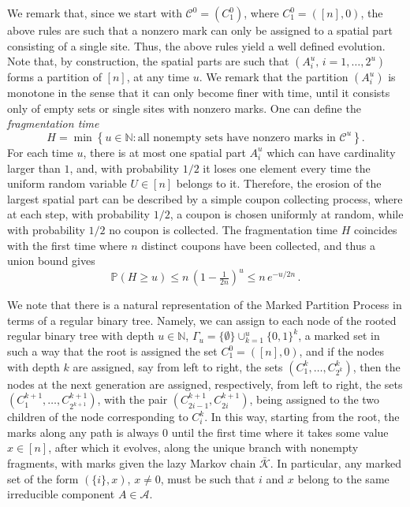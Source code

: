 \documentclass[11pt,reqno]{amsart}
\numberwithin{equation}{section}
\numberwithin{figure}{section}
\renewcommand{\leq}{\le}%
\renewcommand{\geq}{\ge} %
\newcommand{\1}{\mathds{1}}
\let\G=\Gamma
\newcommand{\cA}{\ensuremath{\mathcal A}}
\newcommand{\cC}{\ensuremath{\mathcal C}}
\newcommand{\bbN}{{\ensuremath{\mathbb N}} }
\begin{document}
We remark that, since we start with $\cC^0=(C_1^0)$, where $C_1^0=([n],0)$, the above rules are such that a nonzero mark can only be assigned to a spatial part consisting of a single site.  Thus, the above rules 
yield a well defined evolution. Note that, by construction, the spatial parts are such that $(A^u_i,\,i=1,\dots,2^u)$ forms a partition of $[n]$, at any time $u$.  We remark that the partition $(A^u_i)$ is monotone in the sense that  it can only become finer with time, until it consists only of empty sets or single sites with nonzero marks. One can define the {\em fragmentation time}
\begin{equation}\label{eq:fragt}
H = \min \left\{ u \in \mathbb{N} : \text{all nonempty sets have nonzero marks in } \cC^u \right\}.
\end{equation}
For each time $u$, there is at most one spatial part $A_i^u$ which can have cardinality larger than $1$, and, with probability $1/2$ it loses one element every time the uniform random variable  $U\in[n]$ belongs to it. Therefore, the erosion of the largest spatial part can be described by a simple coupon collecting process, where at each step, with probability $1/2$, a coupon is chosen uniformly at random, while with probability $1/2$ no coupon is collected. The fragmentation time $H$ coincides with the first time where $n$ distinct coupons have been collected, and thus a union bound gives
\begin{equation} \label{coupestimateH}
    \mathbb{P}(H \ge u) \le n\,\left(1-\tfrac1{2n}\right)^u \le n\,e^{-u/2n}\,.
\end{equation}


We note that there is a natural representation of the Marked Partition Process in terms of a regular binary tree. Namely, we can assign to each node of the rooted regular binary tree with depth $u\in\bbN$, $\G_u=\{\emptyset\}\cup_{k=1}^u\{0,1\}^k$, a marked set in such a way that the root is assigned the set $C_1^0=([n],0)$, and if the nodes with depth $k$ are assigned, say from left to right,  the sets $(C_1^k,\dots,C_{2^{k}}^k)$, then the nodes at the next generation are assigned, respectively, from left to right, the sets $(C_1^{k+1},\dots,C_{2^{k+1}}^{k+1})$, with the pair $(C_{2i-1}^{k+1},C_{2i}^{k+1})$, being assigned to the two children of the node corresponding to $C_i^{k}$. In this way, starting from the root, the marks along any path is always $0$ until the first time where it takes some value $x\in[n]$, after which it evolves, along the unique  branch with nonempty fragments, with marks given the lazy Markov chain $ \bar{\mathcal{K}}$. In particular, any marked set of the form $(\{i\},x)$, $x\neq 0$, must be such that $i$ and $x$ belong to the same irreducible component $A\in\cA$. 
\end{document}
